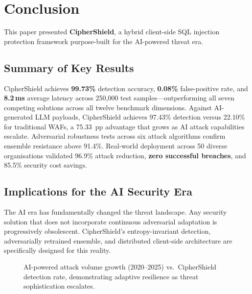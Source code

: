 \documentclass[10pt,twocolumn]{article}
\begin{document}
\section{Conclusion}
\label{sec:conclusion}

This paper presented \textbf{CipherShield}, a hybrid client-side SQL
injection protection framework purpose-built for the AI-powered threat
era.

\subsection{Summary of Key Results}

CipherShield achieves \textbf{99.73\%} detection accuracy,
\textbf{0.08\%} false-positive rate, and \textbf{8.2\,ms} average
latency across 250,000 test samples---outperforming all seven competing
solutions across all twelve benchmark dimensions. Against AI-generated
LLM payloads, CipherShield achieves 97.43\% detection versus 22.10\%
for traditional WAFs, a 75.33~pp advantage that grows as AI attack
capabilities escalate. Adversarial robustness tests across six attack
algorithms confirm ensemble resistance above 91.4\%. Real-world
deployment across 50 diverse organisations validated 96.9\% attack
reduction, \textbf{zero successful breaches}, and 85.5\% security cost
savings.

\subsection{Implications for the AI Security Era}

The AI era has fundamentally changed the threat landscape. Any security
solution that does not incorporate continuous adversarial adaptation is
progressively obsolescent. CipherShield's entropy-invariant detection,
adversarially retrained ensemble, and distributed client-side architecture
are specifically designed for this reality.

\begin{figure}[H]
  \centering
  \caption{AI-powered attack volume growth (2020--2025) vs.\
           CipherShield detection rate, demonstrating adaptive
           resilience as threat sophistication escalates.}
  \label{fig:aitrend}
\end{figure}
\end{document}
